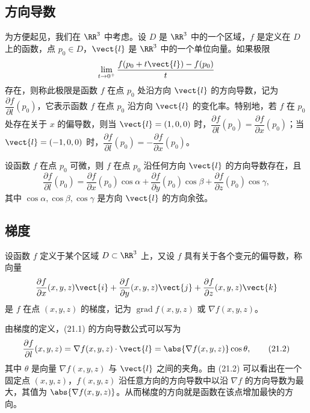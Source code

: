\subsection{方向导数}

为方便起见，我们在 $\RR^3$ 中考虑。设 $D$ 是 $\RR^3$ 中的一个区域，$f$ 是定义在 $D$ 上的函数，点 $p_0\in D$，$\vect{l}$ 是 $\RR^3$ 中的一个单位向量。如果极限
\[
  \lim_{t\to0^+}\frac{f(p_0+t\vect{l})-f(p_0)}{t}
\]
存在，则称此极限是函数 $f$ 在点 $p_0$ 处沿方向 $\vect{l}$ 的方向导数，记为 $\dfrac{\partial f}{\partial l}(p_0)$，它表示函数 $f$ 在点 $p_0$ 沿方向 $\vect{l}$ 的变化率。特别地，若 $f$ 在 $p_0$ 处存在关于 $x$ 的偏导数，则当 $\vect{l}=(1,0,0)$ 时，$\dfrac{\partial f}{\partial l}(p_0)=\dfrac{\partial f}{\partial x}(p_0)$；当 $\vect{l}=(-1,0,0)$ 时，$\dfrac{\partial f}{\partial l}(p_0)=-\dfrac{\partial f}{\partial x}(p_0)$。

\begin{xproposition}[21.2.1]
设函数 $f$ 在点 $p_0$ 可微，则 $f$ 在点 $p_0$ 沿任何方向 $\vect{l}$ 的方向导数存在，且
\begin{equation}
  \frac{\partial f}{\partial l}(p_0)
  =\frac{\partial f}{\partial x}(p_0)\cos\alpha
  +\frac{\partial f}{\partial y}(p_0)\cos\beta
  +\frac{\partial f}{\partial z}(p_0)\cos\gamma,
  \tag{21.1}
  \label{eq:21.1}
\end{equation}
其中 $\cos\alpha,\cos\beta,\cos\gamma$ 是方向 $\vect{l}$ 的方向余弦。
\end{xproposition}

\subsection{梯度}

设函数 $f$ 定义于某个区域 $D\subset\RR^3$ 上，又设 $f$ 具有关于各个变元的偏导数，称向量
\[
  \frac{\partial f}{\partial x}(x,y,z)\vect{i}
  +\frac{\partial f}{\partial y}(x,y,z)\vect{j}
  +\frac{\partial f}{\partial z}(x,y,z)\vect{k}
\]
是 $f$ 在点 $(x,y,z)$ 的梯度，记为 $\operatorname{grad}f(x,y,z)$ 或 $\nabla f(x,y,z)$。

由梯度的定义，(21.1) 的方向导数公式可以写为
\begin{equation}
  \frac{\partial f}{\partial l}(x,y,z)
  =\nabla f(x,y,z)\cdot\vect{l}
  =\abs{\nabla f(x,y,z)}\cos\theta,
  \tag{21.2}
  \label{eq:21.2}
\end{equation}
其中 $\theta$ 是向量 $\nabla f(x,y,z)$ 与 $\vect{l}$ 之间的夹角。由 (21.2) 可以看出在一个固定点 $(x,y,z)$，$f(x,y,z)$ 沿任意方向的方向导数中以沿 $\nabla f$ 的方向导数为最大，其值为 $\abs{\nabla f(x,y,z)}$。从而梯度的方向就是函数在该点增加最快的方向。

